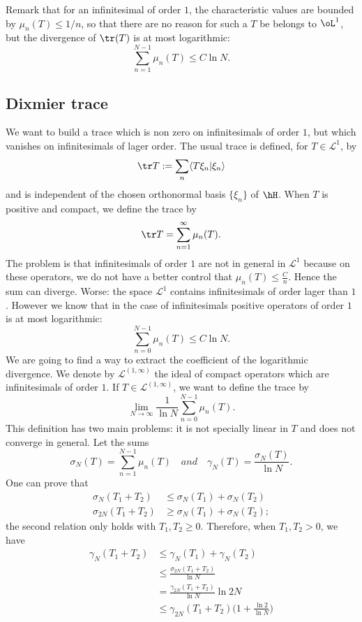 Remark that for an infinitesimal of order $1$, the characteristic values are bounded by $\mu_n(T)\leq 1/n$, so that there are no reason for such a $T$ be belongs to $\oL^1$, but the divergence of $\tr(T)$ is at most logarithmic:
\[
	\sum_{n=1}^{N-1}\mu_n(T)\leq C\ln N.
\]

\subsection{Dixmier trace}

We want to build a trace which is non zero on infinitesimals of order $1$, but which vanishes on infinitesimals of lager order. The usual trace is defined, for $T\in\mathscr{L}^{1}$,  by
\[
	\tr T:=\sum_n\langle T\xi_n|\xi_n\rangle
\]
and is independent of the chosen orthonormal basis $\{ \xi_n \}$ of $\hH$. When $T$ is positive and compact, we define the trace by
\[
	\tr T=\sum_{n=1}^{\infty}\mu_n(T).
\]
The problem is that infinitesimals of order $1$ are not in general in $\mathscr{L}^{1}$ because on these operators, we do not have a better control that $\mu_n(T)\leq \frac{ C }{ n }$. Hence the sum can diverge. Worse: the space $\mathscr{L}^{1}$ contains infinitesimals of order lager than $1$. However we know that in the case of infinitesimals positive operators of order $1$ is at most logarithmic:
\[
	\sum_{n=0}^{N-1}\mu_n(T)\leq C\ln N.
\]
We are going to find a way to extract the coefficient of the logarithmic divergence. We denote by $\mathscr{L}^{(1,\infty)}$ the ideal of compact operators which are infinitesimals of order $1$. If $T\in\mathscr{L}^{(1,\infty)}$, we want to define the trace by
\[
	\lim_{N\to\infty}\frac{1}{ \ln N }\sum_{n=0}^{N-1}\mu_n(T).
\]
This definition has two main problems: it is not specially linear in $T$ and does not converge in general. Let the sums
\[
	\sigma_N(T)=\sum_{n=1}^{N-1}\mu_n(T)\quad{ and }\quad\gamma_N(T)=\frac{ \sigma_N(T) }{ \ln N }.
\]
One can prove that
\begin{subequations}
	\begin{align}
		\sigma_N(T_1+T_2)    & \leq\sigma_N(T_1)+\sigma_N(T_2)  \\
		\sigma_{2N}(T_1+T_2) & \geq\sigma_N(T_1)+\sigma_N(T_2);
	\end{align}
\end{subequations}
the second relation only holds with $T_1,T_2\geq0$. Therefore, when $T_1,T_2>0$, we have
\begin{equation} \label{eq_gammaNleq}
	\begin{split}
		\gamma_N(T_1+T_2)&\leq \gamma_N(T_1)+\gamma_N(T_2)\\
		&\leq \frac{ \sigma_{2N}(T_1+T_2) }{ \ln N }\\
		&=\frac{ \gamma_{2N}(T_1+T_2) }{ \ln N }\ln 2N\\
		&\leq \gamma_{2N}(T_1+T_2)\big( 1+\frac{ \ln 2 }{ \ln N } \big)
	\end{split}
\end{equation}
